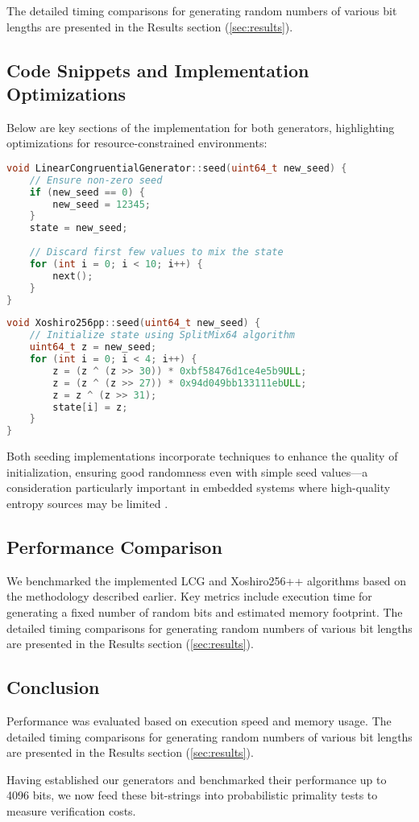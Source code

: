 The detailed timing comparisons for generating random numbers of various bit lengths are presented in the Results section (\autoref{sec:results}).

\subsection{Code Snippets and Implementation Optimizations}

Below are key sections of the implementation for both generators, highlighting optimizations for resource-constrained environments:

\begin{lstlisting}[language=C++, caption=LCG Seeding Implementation]
void LinearCongruentialGenerator::seed(uint64_t new_seed) {
    // Ensure non-zero seed
    if (new_seed == 0) {
        new_seed = 12345;
    }
    state = new_seed;
    
    // Discard first few values to mix the state
    for (int i = 0; i < 10; i++) {
        next();
    }
}
\end{lstlisting}

\begin{lstlisting}[language=C++, caption=Xoshiro256++ Seeding Implementation]
void Xoshiro256pp::seed(uint64_t new_seed) {
    // Initialize state using SplitMix64 algorithm
    uint64_t z = new_seed;
    for (int i = 0; i < 4; i++) {
        z = (z ^ (z >> 30)) * 0xbf58476d1ce4e5b9ULL;
        z = (z ^ (z >> 27)) * 0x94d049bb133111ebULL;
        z = z ^ (z >> 31);
        state[i] = z;
    }
}
\end{lstlisting}

Both seeding implementations incorporate techniques to enhance the quality of initialization, ensuring good randomness even with simple seed values—a consideration particularly important in embedded systems where high-quality entropy sources may be limited \cite{embedded_prng}.

\subsection{Performance Comparison}
We benchmarked the implemented LCG and Xoshiro256++ algorithms based on the methodology described earlier. Key metrics include execution time for generating a fixed number of random bits and estimated memory footprint. The detailed timing comparisons for generating random numbers of various bit lengths are presented in the Results section (\autoref{sec:results}).

\subsection{Conclusion}
Performance was evaluated based on execution speed and memory usage. The detailed timing comparisons for generating random numbers of various bit lengths are presented in the Results section (\autoref{sec:results}). 

Having established our generators and benchmarked their performance up to 4096 bits, we now feed these bit-strings into probabilistic primality tests to measure verification costs.
